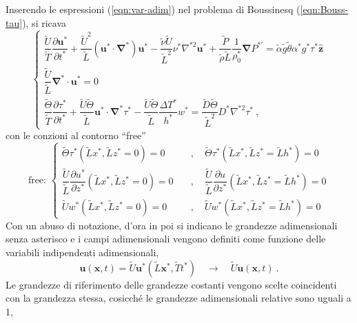 Inserendo le espressioni (\ref{eqn:var-adim}) nel problema di Boussinesq (\ref{eqn:Bouss-tau}), si ricava
\begin{equation}\label{eqn:Bouss-tau-adim-1}
    \begin{cases}
      \dfrac{\tilde{U}}{\tilde{T}}\dfrac{\partial \bm{u}^*}{\partial t^*} + \dfrac{\tilde{U}^2}{\tilde{L}}
      \left( \bm{u}^* \cdot \bm{\nabla}^* \right) \bm{u}^* -
      \dfrac{\tilde{\nu} \tilde{U}}{\tilde{L}^2} \nu^* \nabla^{*2} \bm{u}^* + \dfrac{\tilde{P}}{\tilde{\rho} \tilde{L}}\dfrac{1}{\rho_0^*}\bm{\nabla} P^{*'} = \tilde{\alpha} \tilde{g} \tilde{\theta} \alpha^*  g^* \tau^* \bm{\hat{z}} \\
      \dfrac{\tilde{U}}{\tilde{L}}\bm{\nabla}^* \cdot \bm{u}^* = 0 \\
      \dfrac{\tilde{\Theta}}{\tilde{T}}\dfrac{\partial \tau^*}{\partial t^*} + \dfrac{\tilde{U}\tilde{\Theta}}{\tilde{L}}\bm{u}^* \cdot 
      \bm{\nabla}^* \tau^* - \dfrac{\tilde{U}\tilde{\Theta}}{\tilde{L}}\dfrac{\Delta T^*}{h^*} w^* = \dfrac{\tilde{D}\tilde{\Theta}}{\tilde{L}^2} D^* \nabla^{*2} \tau^* \ ,
    \end{cases}
\end{equation}
con le conzioni al contorno ``free''
\begin{equation}
    \text{free: } \left\{
    \begin{aligned}
      \tilde{\Theta}\tau^*(\tilde{L}x^*,\tilde{L}z^*=0) = 0 \quad & , \quad  
      \tilde{\Theta}\tau^*(\tilde{L}x^*,\tilde{L}z^*=\tilde{L}h^*) = 0 \\
      \dfrac{\tilde{U}}{\tilde{L}}\dfrac{\partial u^*}{\partial z^*}(\tilde{L}x^*,\tilde{L}z^*=0) = 0 \quad  & , \quad 
      \dfrac{\tilde{U}}{\tilde{L}}\dfrac{\partial u}{\partial z^*}(\tilde{L}x^*,\tilde{L}z^*=\tilde{L}h^*) = 0 \\
      \tilde{U} w^*(\tilde{L}x^*,\tilde{L}z^*=0) = 0 \quad  & , \quad 
      \tilde{U} w^*(\tilde{L}x^*,\tilde{L}z^*=\tilde{L}h^*) = 0
    \end{aligned} \right.
\end{equation}
Con un abuso di notazione, d'ora in poi si indicano le grandezze adimensionali senza asterisco e i campi adimensionali vengono definiti come funzione delle variabili indipendenti adimensionali,
\begin{equation}
    \bm{u}(\bm{x},t) = \tilde{U} \bm{u}^*(\tilde{L} \bm{x}^*, \tilde{T} t^*) \quad \rightarrow \quad \tilde{U} \bm{u}(\bm{x},  t) \ .
\end{equation}
Le grandezze di riferimento delle grandezze costanti vengono scelte coincidenti con la grandezza stessa, cosicché le grandezze adimensionali relative sono uguali a 1,
